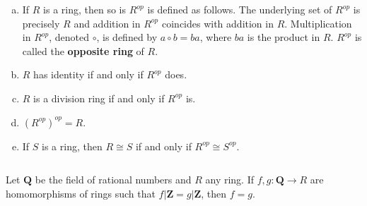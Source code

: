 $$ $$

\begin{ex}
    \begin{enumerate}[(a)]
        \item If $R$ is a ring, then so is $R^{op}$ is defined as follows. The underlying set of $R^{op}$ is precisely $R$ and addition in $R^{op}$ coincides with addition in $R$. Multiplication in $R^{op}$, denoted $\circ$, is defined by $a\circ b=ba$, where $ba$ is the product in $R$. $R^{op}$ is called the \textbf{opposite ring} of $R$.
        \item $R$ has identity if and only if $R^{op}$ does.
        \item $R$ is a division ring if and only if $R^{op}$ is.
        \item $(R^{op})^{op}=R$.
        \item If $S$ is a ring, then $R\cong S$ if and only if $R^{op}\cong S^{op}$.
    \end{enumerate}
\end{ex}

$$ $$

\begin{ex}
    Let $\mathbf{Q}$ be the field of rational numbers and $R$ any ring. If $f, g:\mathbf{Q}\to R$ are homomorphisms of rings such that $f|\mathbf{Z}=g|\mathbf{Z}$, then $f=g$.
\end{ex}